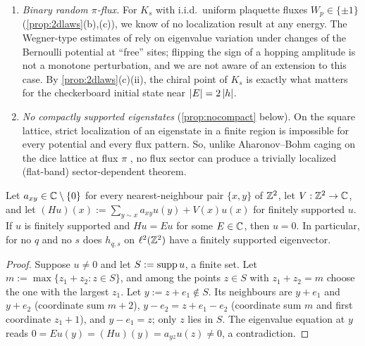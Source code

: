 \begin{enumerate}[label=(\arabic*)]
$\mu_x$ lies in an excluded window, and \cite{LiL2022} gives no information about the dynamics started at $x$.
\item \emph{Binary random $\pi$-flux.}  For $K_s$ with i.i.d.\ uniform plaquette fluxes $W_p\in\{\pm1\}$
(\cref{prop:2dlaws}(b),(c)), we know of no localization result at any energy.  The Wegner-type estimates of
\cite{DingSmart2020,LiL2022} rely on eigenvalue variation under changes of the Bernoulli potential at ``free''
sites; flipping the sign of a hopping amplitude is not a monotone perturbation, and we are not aware of an
extension to this case.  By
\cref{prop:2dlaws}(c)(ii), the chiral point of $K_s$ is exactly what matters for the checkerboard initial state
near $\left|E\right|=2\left|h\right|$.
\item \emph{No compactly supported eigenstates} (\cref{prop:nocompact} below).  On the square lattice, strict
localization of an eigenstate in a finite region is impossible for every potential and every flux pattern.  So,
unlike Aharonov--Bohm caging on the dice lattice at flux $\pi$ \cite{VidalMosseriDoucot1998}, no flux sector can
produce a trivially localized (flat-band) sector-dependent theorem.
\end{enumerate}

\begin{proposition}\label{prop:nocompact}
Let $a_{xy}\in\mathbb{C}\setminus\{0\}$ for every nearest-neighbour pair $\{x,y\}$ of $\mathbb{Z}^2$, let $V:\mathbb{Z}^2\to\mathbb{C}$, and let
$(Hu)(x):=\sum_{y\sim x}a_{xy}u(y)+V(x)u(x)$ for finitely supported $u$.  If $u$ is finitely supported and $Hu=Eu$ for
some $E\in\mathbb{C}$, then $u=0$.  In particular, for no $q$ and no $s$ does $h_{q,s}$ on $\ell^2(\mathbb{Z}^2)$ have a finitely
supported eigenvector.
\end{proposition}

\begin{proof}
Suppose $u\neq0$ and let $S:=\operatorname{supp} u$, a finite set.  Let $m:=\max\{z_1+z_2:z\in S\}$, and among the points $z\in S$
with $z_1+z_2=m$ choose the one with the largest $z_1$.  Let $y:=z+e_1\notin S$.  Its neighbours are $y+e_1$ and
$y+e_2$ (coordinate sum $m+2$), $y-e_2=z+e_1-e_2$ (coordinate sum $m$ and first coordinate $z_1+1$), and $y-e_1=z$;
only $z$ lies in $S$.  The eigenvalue equation at $y$ reads $0=Eu(y)=(Hu)(y)=a_{yz}u(z)\neq0$, a contradiction.
\end{proof}

